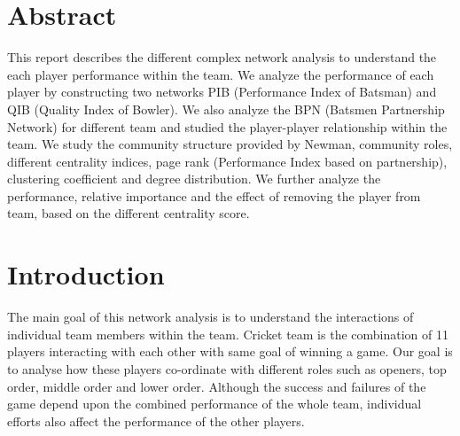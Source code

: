 \documentclass{article}
\begin{document}

\vspace{0.25cm}

\section{Abstract}
This report describes the different complex network analysis to understand the each player performance within the team. We analyze the performance of each player by constructing two networks PIB (Performance Index of Batsman) and QIB (Quality Index of Bowler). We also analyze the BPN (Batsmen Partnership Network) for different team and studied the player-player relationship within the team. We study the community structure provided by Newman, community roles, different centrality indices, page rank (Performance Index based on partnership), clustering coefficient and degree distribution. We further analyze the performance, relative importance and the effect of removing the player from team, based on the different centrality score.

\section{Introduction}
The main goal of this network analysis is to understand the interactions of individual team members within the team. Cricket team is the combination of 11 players interacting with each other with same goal of winning a game. Our goal is to analyse how these players co-ordinate with different roles such as openers, top order, middle order and lower order. Although the success and failures of the game depend upon the combined performance of the whole team, individual efforts also affect the performance of the other players.
\end{document}
